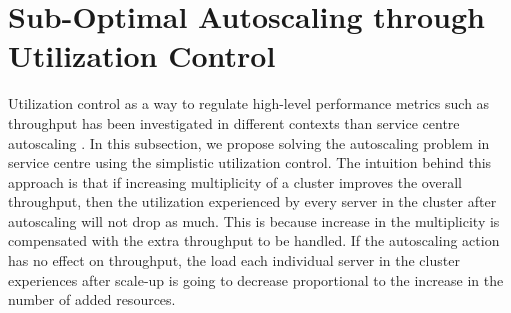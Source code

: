 % 
%  
  

  \section{Sub-Optimal Autoscaling through Utilization Control}   %
  \label{sec:non-optimal-autoscaling}   
 
   Utilization control as a way to regulate high-level performance metrics such as throughput has been investigated in different contexts than service centre autoscaling \cite{kalyvianaki_self-adaptive_2009}.  In this subsection, we propose solving the autoscaling problem in service centre using the simplistic utilization control.
    The intuition behind this approach is that if increasing multiplicity of a cluster improves the overall throughput, then the utilization experienced by every server in the cluster after autoscaling will not drop as much. This is because increase in the multiplicity is compensated with the extra throughput to be handled. If the autoscaling action has no effect on throughput, the load each individual server in the cluster experiences after scale-up is going to decrease proportional to the increase in the number of added resources. 
       
  
